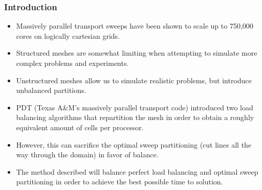 \documentclass[xcolor={usenames,dvipsnames,svgnames,table}]{beamer}
\begin{document}
\begin{frame}[t]\frametitle{Introduction}
\begin{block}{}
\begin{itemize}
	\item Massively parallel transport sweeps have been shown to scale up to 750,000 cores on logically cartesian grids.
	\item Structured meshes are somewhat limiting when attempting to simulate more complex problems and experiments.
	\item Unstructured meshes allow us to simulate realistic problems, but introduce unbalanced partitions. 
	\item PDT (Texas A\&M's massively parallel transport code) introduced two load balancing algorithms that repartition the mesh in order to obtain a roughly equivalent amount of cells per processor. 
	\item However, this can sacrifice the optimal sweep partitioning (cut lines all the way through the domain) in favor of balance. 
	\item The method described will balance perfect load balancing and optimal sweep partitioning in order to achieve the best possible time to solution.
\end{itemize}
\end{block}
\end{frame}
\end{document}
